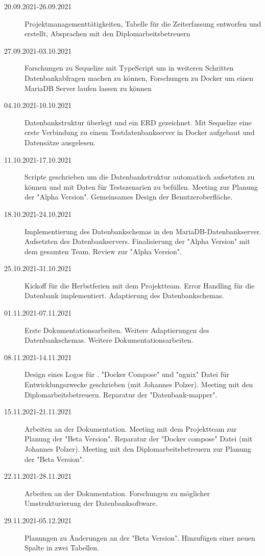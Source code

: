 
\begin{description}
    \item[20.09.2021-26.09.2021] Projektmanagementtätigkeiten, Tabelle für die Zeiterfassung entworfen und erstellt, Absprachen mit den Diplomarbeitsbetreuern
    \item[27.09.2021-03.10.2021] Forschungen zu Sequelize mit TypeScript um in weiteren Schritten Datenbankabfragen machen zu können, Forschungen zu Docker um einen MariaDB Server laufen lassen zu können
    \item[04.10.2021-10.10.2021] Datenbankstruktur überlegt und ein ERD gezeichnet. Mit Sequelize eine erste Verbindung zu einem Testdatenbankserver in Docker aufgebaut und Datensätze ausgelesen.
    \item[11.10.2021-17.10.2021] Scripte geschrieben um die Datenbankstruktur automatisch aufsetzten zu können und mit Daten für Testszenarien zu befüllen. Meeting zur Planung der "Alpha Version". Gemeinsames Design der Benutzeroberfläche.
    \item[18.10.2021-24.10.2021] Implementierung des Datenbankschemas in den Maria\-DB-Datenbankserver. Aufsetzten des Datenbankservers. Finalisierung der "Alpha Version" mit dem gesamten Team. Review zur "Alpha Version".
    \item[25.10.2021-31.10.2021] Kickoff für die Herbstferien mit dem Projektteam. Error\- Handling für die Datenbank implementiert. Adaptierung des Datenbankschemas.
    \item[01.11.2021-07.11.2021] Erste Dokumentationsarbeiten. Weitere Adaptierungen des Datenbankschemas. Weitere Dokumentationsarbeiten.
    \item[08.11.2021-14.11.2021] Design eines Logos für \ZELIA. "Docker Compose" und "ngnix" Datei für Entwicklungszwecke geschrieben (mit Johannes Polzer). Meeting mit den Diplomarbeitsbetreuern. Reparatur der "Datenbank-mapper". 
    \item[15.11.2021-21.11.2021] Arbeiten an der Dokumentation. Meeting mit dem Projektteam zur Planung der "Beta Version". Reparatur der "Docker compose" Datei (mit Johannes Polzer). Meeting mit den Diplomarbeitsbetreuern zur Planung der "Beta Version".  
    \item[22.11.2021-28.11.2021] Arbeiten an der Dokumentation. Forschungen zu möglicher Umstrukturierung der Datenbanksoftware.
    \item[29.11.2021-05.12.2021] Planungen zu Änderungen an der "Beta Version". Hinzufügen einer neuen Spalte in zwei Tabellen. 

\end{description}
